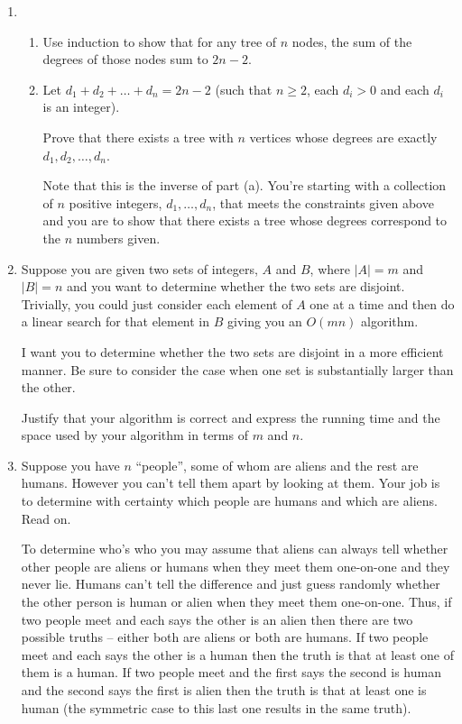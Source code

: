 \documentclass[11pt]{article}
\begin{document}
\begin{enumerate}[1.]

\item 

\begin{enumerate}
\item Use induction to show that for any tree of $n$ nodes, the sum of the degrees of those nodes sum to $2n-2$.

\item Let $d_1 + d_2 + \ldots + d_n = 2n - 2$ (such that $n \geq 2$, each $d_i > 0$ and each $d_i$ is an integer).  

Prove that there exists a tree with $n$ vertices whose degrees are exactly $d_1, d_2, \ldots, d_n$.

Note that this is the inverse of part (a).  You're starting with a collection of $n$ positive integers, $d_1, \ldots, d_n$, that meets the constraints given above and you are to show that there exists a tree whose degrees correspond to the $n$ numbers given.  
\end{enumerate}


\item  Suppose you are given two sets of integers, $A$ and $B$, where $|A| = m$ and $|B| = n$ and you want to determine whether the two sets are disjoint.  Trivially, you could just consider each element of $A$ one at a time and then do a linear search for that element in $B$ giving you an $O(mn)$ algorithm.  

I want you to determine whether the two sets are disjoint in a more efficient manner.  Be sure to consider the case when one set is substantially larger than the other. 

Justify that your algorithm is correct and express the running time and the space used by your algorithm in terms of $m$ and $n$. 


\item  Suppose you have $n$ ``people'', some of whom are aliens and the rest are humans.  However you can't tell them apart by looking at them.  Your job is to determine with certainty which people are humans and which are aliens.  Read on.   

To determine who's who you may assume that aliens can always tell whether other people are aliens or humans when they meet them one-on-one and they never lie.  Humans can't tell the difference and just guess randomly whether the other person is human or alien when they meet them one-on-one.  Thus, if two people meet and each says the other is an alien then there are two possible truths -- either both are aliens or both are humans.  If two people meet and each says the other is a human then the truth is that at least one of them is a human.  If two people meet and the first says the second is human and the second says the first is alien then the truth is that at least one is human (the symmetric case to this last one results in the same truth).  


\end{enumerate}
\end{document}

